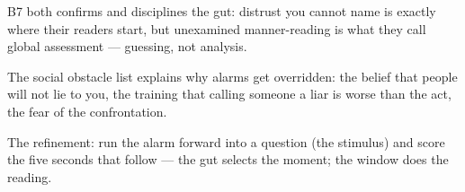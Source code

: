 

\begin{distilled}
  \item B7 both confirms and disciplines the gut: distrust you cannot name is exactly where their readers start, but unexamined manner-reading is what they call global assessment --- guessing, not analysis.
  \item The social obstacle list explains why alarms get overridden: the belief that people will not lie to you, the training that calling someone a liar is worse than the act, the fear of the confrontation.
  \item The refinement: run the alarm forward into a question (the stimulus) and score the five seconds that follow --- the gut selects the moment; the window does the reading.
\end{distilled}
